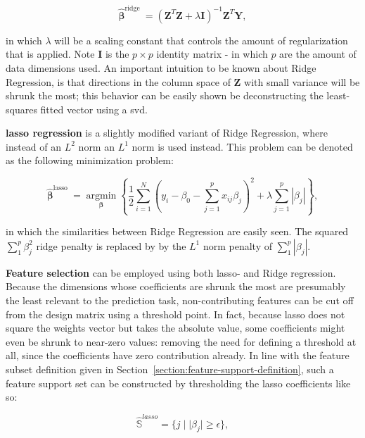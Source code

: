\documentclass{article}
\begin{document}
\begin{equation}\hat{\boldsymbol{\beta}}^{\text {ridge }}=\left(\mathbf{Z}^{T} \mathbf{Z}+\lambda \mathbf{I}\right)^{-1} \mathbf{Z}^{T} \mathbf{Y},\end{equation}

in which $\lambda$ will be a scaling constant that controls the amount of regularization that is applied. Note $\mathbf{I}$ is the $p \times p$ identity matrix - in which $p$ are the amount of data dimensions used. An important intuition to be known about Ridge Regression, is that directions in the column space of $\mathbf{Z}$ with small variance will be shrunk the most; this behavior can be easily shown be deconstructing the least-squares fitted vector using a \gls{svd}. 

\textbf{\gls{lasso} regression} is a slightly modified variant of Ridge Regression, where instead of an $L^2$ norm an $L^1$ norm is used instead. This problem can be denoted as the following minimization problem:

\begin{equation}
\hat{\boldsymbol{\beta}}^{\text {lasso }}=\underset{\boldsymbol{\beta}}{\operatorname{argmin}}\left\{\frac{1}{2} \sum_{i=1}^{N}\left(y_{i}-\beta_{0}-\sum_{j=1}^{p} x_{i j} \beta_{j}\right)^{2}+\lambda \sum_{j=1}^{p}\left|\beta_{j}\right|\right\},
\end{equation}

in which the similarities between Ridge Regression are easily seen. The squared $\sum_1^p \beta^2_j$ ridge penalty is replaced by by the $L^1$ norm penalty of $\sum_1^p |\beta_j|$.

\textbf{Feature selection} can be employed using both \gls{lasso}- and Ridge regression. Because the dimensions whose coefficients are shrunk the most are presumably the least relevant to the prediction task, non-contributing features can be cut off from the design matrix using a threshold point. In fact, because \gls{lasso} does not square the weights vector but takes the absolute value, some coefficients might even be shrunk to near-zero values: removing the need for defining a threshold at all, since the coefficients have zero contribution already. In line with the feature subset definition given in Section~\ref{section:feature-support-definition}, such a feature support set can be constructed by thresholding the \gls{lasso} coefficients like so:

\begin{equation}
\hat{\mathbb{S}}^{lasso} = \{ j \mid \lvert \beta_j \rvert \geq \epsilon \},
\end{equation}
\end{document}
